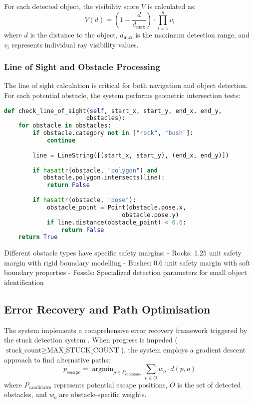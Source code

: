 \documentclass{csfourzero}
\begin{document}
For each detected object, the visibility score $V$ is calculated as:
\[
V(d) = (1 - \frac{d}{d_{\text{max}}}) \cdot \prod_{i=1}^n v_i
\]
where $d$ is the distance to the object, $d_{\text{max}}$ is the maximum detection range, and $v_i$ represents individual ray visibility values.

\subsubsection{Line of Sight and Obstacle Processing}

The line of sight calculation is critical for both navigation and object detection. For each potential obstacle, the system performs geometric intersection tests:

\begin{lstlisting}[language=Python]
def check_line_of_sight(self, start_x, start_y, end_x, end_y, 
                       obstacles):
    for obstacle in obstacles:
        if obstacle.category not in ["rock", "bush"]:
            continue
        
        line = LineString([(start_x, start_y), (end_x, end_y)])
        
        if hasattr(obstacle, "polygon") and 
           obstacle.polygon.intersects(line):
            return False
            
        if hasattr(obstacle, "pose"):
            obstacle_point = Point(obstacle.pose.x, 
                                 obstacle.pose.y)
            if line.distance(obstacle_point) < 0.6:
                return False
    return True
\end{lstlisting}

Different obstacle types have specific safety margins:
- Rocks: 1.25 unit safety margin with rigid boundary modelling
- Bushes: 0.6 unit safety margin with soft boundary properties
- Fossils: Specialized detection parameters for small object identification

\subsection{Error Recovery and Path Optimisation}
The system implements a comprehensive error recovery framework triggered by the stuck detection system \cite{Oh2016}. When progress is impeded ($\text{stuck\_count} \geq \text{MAX\_STUCK\_COUNT}$), the system employs a gradient descent approach to find alternative paths:
$$
p_{\text{escape}} = \operatorname{argmin}_{p \in P_{\text{candidates}}} \sum_{o \in O} w_o \cdot d(p, o)
$$
where $P_{\text{candidates}}$ represents potential escape positions, $O$ is the set of detected obstacles, and $w_o$ are obstacle-specific weights.
\end{document}
